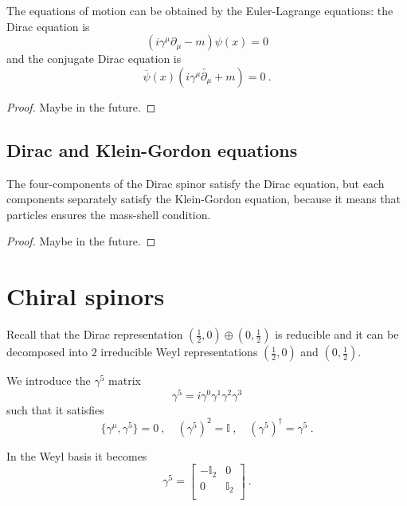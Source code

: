     The equations of motion can be obtained by the Euler-Lagrange equations: the Dirac equation is 
    \begin{equation*}
        (i \gamma^\mu \partial_\mu - m) \psi(x) = 0
    \end{equation*}
    and the conjugate Dirac equation is 
    \begin{equation*}
        \overline \psi(x) (i \gamma^\mu \overleftarrow{\partial_\mu} + m) = 0 ~.
    \end{equation*}
    \begin{proof}
        Maybe in the future.
    \end{proof}

\section{Dirac and Klein-Gordon equations}

    The four-components of the Dirac spinor satisfy the Dirac equation, but each components separately satisfy the Klein-Gordon equation, because it means that particles ensures the mass-shell condition.
    \begin{proof}
        Maybe in the future.
    \end{proof}

\chapter{Chiral spinors}

    Recall that the Dirac representation $(\frac{1}{2}, 0) \oplus (0, \frac{1}{2})$ is reducible and it can be decomposed into $2$ irreducible Weyl representations $(\frac{1}{2}, 0)$ and $(0, \frac{1}{2})$. 

    We introduce the $\gamma^5$ matrix 
    \begin{equation*}
        \gamma^5 = i \gamma^0 \gamma^1 \gamma^2 \gamma^3
    \end{equation*}
    such that it satisfies 
    \begin{equation*}
        \{\gamma^\mu, \gamma^5\} = 0~, \quad (\gamma^5)^2 = \mathbb I~, \quad (\gamma^5)^\dagger = \gamma^5 ~.
    \end{equation*}
    
    In the Weyl basis it becomes 
    \begin{equation*}
        \gamma^5 = \begin{bmatrix}
            - \mathbb I_2 & 0 \\ 0 & \mathbb I_2 \\
        \end{bmatrix} ~.
    \end{equation*}

